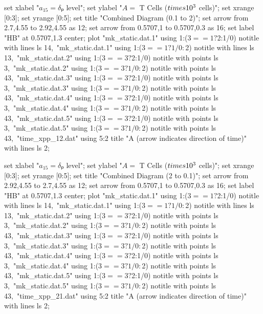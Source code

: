   set xlabel "$a_{15} = δₚ$ level";
  set ylabel "$A = $ T Cells ($\\times 10^3$ cells)";
  set xrange [0:3];
  set yrange [0:5];
  set title "Combined Diagram (0.1 to 2)";
  set arrow from 2.7,4.55 to 2.92,4.55 as 12;
  set arrow from 0.5707,1 to 0.5707,0.3 as 16;
  set label "HB" at 0.5707,1.3 center;
  plot "mk_static.dat.1" using 1:($3==1?$2:1/0) notitle with lines ls 14,\
       "mk_static.dat.1" using 1:($3==1?1/0:$2) notitle with lines ls 13,\
       "mk_static.dat.2" using 1:($3==3?$2:1/0) notitle with points ls 3,\
       "mk_static.dat.2" using 1:($3==3?1/0:$2) notitle with points ls 43,\
       "mk_static.dat.3" using 1:($3==3?$2:1/0) notitle with points ls 3,\
       "mk_static.dat.3" using 1:($3==3?1/0:$2) notitle with points ls 43,\
       "mk_static.dat.4" using 1:($3==3?$2:1/0) notitle with points ls 3,\
       "mk_static.dat.4" using 1:($3==3?1/0:$2) notitle with points ls 43,\
       "mk_static.dat.5" using 1:($3==3?$2:1/0) notitle with points ls 3,\
       "mk_static.dat.5" using 1:($3==3?1/0:$2) notitle with points ls 43,\
       "time_xpp_12.dat" using 5:2 title "A (arrow indicates direction of time)" with lines ls 2;
\stopGNUPLOTscript

\startGNUPLOTscript[bifurcation_combined_21]
  set xlabel "$a_{15} = δₚ$ level";
  set ylabel "$A = $ T Cells ($\\times 10^3$ cells)";
  set xrange [0:3];
  set yrange [0:5];
  set title "Combined Diagram (2 to 0.1)";
  set arrow from 2.92,4.55 to 2.7,4.55 as 12;
  set arrow from 0.5707,1 to 0.5707,0.3 as 16;
  set label "HB" at 0.5707,1.3 center;
  plot "mk_static.dat.1" using 1:($3==1?$2:1/0) notitle with lines ls 14,\
       "mk_static.dat.1" using 1:($3==1?1/0:$2) notitle with lines ls 13,\
       "mk_static.dat.2" using 1:($3==3?$2:1/0) notitle with points ls 3,\
       "mk_static.dat.2" using 1:($3==3?1/0:$2) notitle with points ls 43,\
       "mk_static.dat.3" using 1:($3==3?$2:1/0) notitle with points ls 3,\
       "mk_static.dat.3" using 1:($3==3?1/0:$2) notitle with points ls 43,\
       "mk_static.dat.4" using 1:($3==3?$2:1/0) notitle with points ls 3,\
       "mk_static.dat.4" using 1:($3==3?1/0:$2) notitle with points ls 43,\
       "mk_static.dat.5" using 1:($3==3?$2:1/0) notitle with points ls 3,\
       "mk_static.dat.5" using 1:($3==3?1/0:$2) notitle with points ls 43,\
       "time_xpp_21.dat" using 5:2 title "A (arrow indicates direction of time)" with lines ls 2;
\stopGNUPLOTscript

